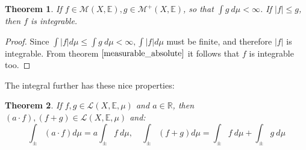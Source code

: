 \documentclass[12pt, a4paper]{article}
\newtheorem{theorem}{Theorem}[section]
\numberwithin{equation}{section}
\begin{document}
\begin{theorem}
\label{dominated_integrability}
If $f\in\mathcal{M}(X,\mathbb{E}), g\in\mathcal{M}^+(X,\mathbb{E})$, so that $\int g\ d\mu<\infty$. If $|f|\le g$, then $f$ is integrable.
\end{theorem}
\begin{proof}
Since $\int|f|d\mu\le\int g\ d\mu<\infty, \int|f|d\mu$ must be finite, and therefore $|f|$ is integrable. From theorem $\ref{measurable_absolute}$ it follows that $f$ is integrable too.
\end{proof}

The integral further has these nice properties:

\begin{theorem}
\label{integrable_linearity}
If $f, g\in\mathcal{L}(X,\mathbb{E},\mu)$ and $a\in\mathbb{R}$, then $(a\cdot f), (f+g)\in\mathcal{L}(X,\mathbb{E},\mu)$ and:
\begin{equation}
\int_\pm(a\cdot f)d\mu=a\int_\pm f\ d\mu,\quad\int_\pm(f+g)d\mu=\int_\pm f\ d\mu+\int_\pm g\ d\mu
\end{equation}
\end{theorem}
\end{document}
